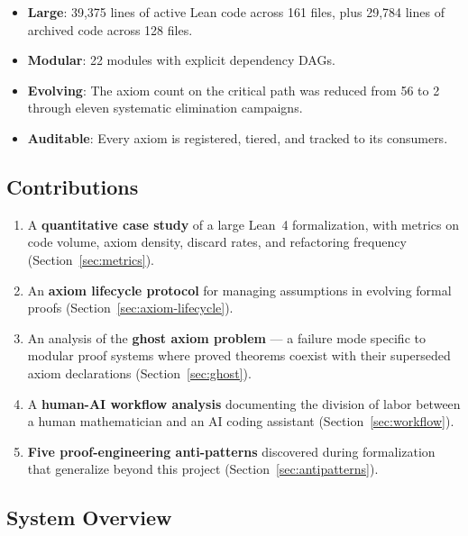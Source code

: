 \documentclass[11pt,a4paper]{article}
\begin{document}
\begin{itemize}
  \item \textbf{Large}: 39,375 lines of active Lean code across 161 files,
    plus 29,784 lines of archived code across 128 files.
  \item \textbf{Modular}: 22 modules with explicit dependency DAGs.
  \item \textbf{Evolving}: The axiom count on the critical path was
    reduced from 56 to 2 through eleven systematic elimination campaigns.
  \item \textbf{Auditable}: Every axiom is registered, tiered, and tracked
    to its consumers.
\end{itemize}

\subsection{Contributions}

\begin{enumerate}
  \item A \textbf{quantitative case study} of a large Lean~4 formalization,
    with metrics on code volume, axiom density, discard rates, and
    refactoring frequency (Section~\ref{sec:metrics}).
  \item An \textbf{axiom lifecycle protocol} for managing assumptions
    in evolving formal proofs (Section~\ref{sec:axiom-lifecycle}).
  \item An analysis of the \textbf{ghost axiom problem} --- a failure
    mode specific to modular proof systems where proved theorems
    coexist with their superseded axiom declarations
    (Section~\ref{sec:ghost}).
  \item A \textbf{human-AI workflow analysis} documenting the division
    of labor between a human mathematician and an AI coding assistant
    (Section~\ref{sec:workflow}).
  \item \textbf{Five proof-engineering anti-patterns} discovered during
    formalization that generalize beyond this project
    (Section~\ref{sec:antipatterns}).
\end{enumerate}

\subsection{System Overview}
\end{document}
